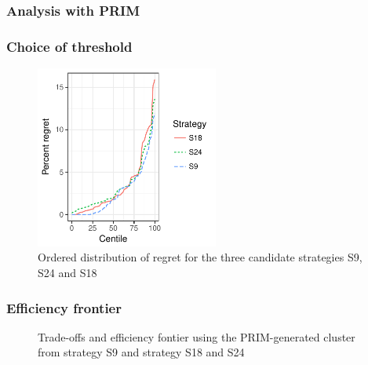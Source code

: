 
\clearpage

\subsubsection{Analysis with PRIM}


\subsubsection{Choice of threshold}

\begin{figure}
	\centering
	\includegraphics[width=6cm]{figures/quantile_regret.pdf}
	\caption{Ordered distribution of regret for the three candidate strategies S9, S24 and S18}
	\label{fig:quantile_regret}
\end{figure}



\subsubsection{Efficiency frontier}

\begin{figure}
	\centering
	\caption{Trade-offs and efficiency fontier using the PRIM-generated cluster from strategy S9 and strategy S18 and S24}
	\label{fig_app:low_regret_frontier}
\end{figure}


